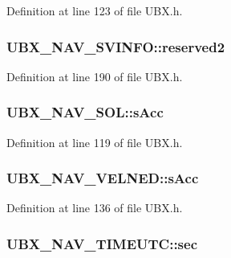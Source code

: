 Definition at line 123 of file U\-B\-X.\-h.

\hypertarget{group___g_s_p_module_ga2c5c4d3b1882220da507ddacbe43159b}{
\subsubsection[{reserved2}]{ U\-B\-X\-\_\-\-N\-A\-V\-\_\-\-S\-V\-I\-N\-F\-O\-::reserved2}}\label{group___g_s_p_module_ga2c5c4d3b1882220da507ddacbe43159b}


Definition at line 190 of file U\-B\-X.\-h.

\hypertarget{group___g_s_p_module_ga2f523fbe2cf2e2eeb885e5e54d633f17}{
\subsubsection[{s\-Acc}]{ U\-B\-X\-\_\-\-N\-A\-V\-\_\-\-S\-O\-L\-::s\-Acc}}\label{group___g_s_p_module_ga2f523fbe2cf2e2eeb885e5e54d633f17}


Definition at line 119 of file U\-B\-X.\-h.

\hypertarget{group___g_s_p_module_ga50bfd12e0c7398ab16e312e6a9332e7d}{
\subsubsection[{s\-Acc}]{ U\-B\-X\-\_\-\-N\-A\-V\-\_\-\-V\-E\-L\-N\-E\-D\-::s\-Acc}}\label{group___g_s_p_module_ga50bfd12e0c7398ab16e312e6a9332e7d}


Definition at line 136 of file U\-B\-X.\-h.

\hypertarget{group___g_s_p_module_gadf8744b17bc7095cc06d9f0909bd865d}{
\subsubsection[{sec}]{ U\-B\-X\-\_\-\-N\-A\-V\-\_\-\-T\-I\-M\-E\-U\-T\-C\-::sec}}\label{group___g_s_p_module_gadf8744b17bc7095cc06d9f0909bd865d}


